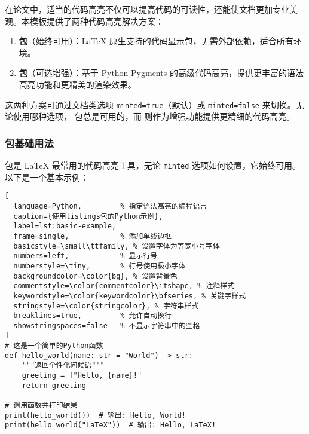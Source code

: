 在论文中，适当的代码高亮不仅可以提高代码的可读性，还能使文档更加专业美观。本模板提供了两种代码高亮解决方案：

\begin{enumerate}
  \item \textbf{ 包}（始终可用）：\LaTeX{} 原生支持的代码显示包，无需外部依赖，适合所有环境。
  \item \textbf{ 包}（可选增强）：基于 Python Pygments 的高级代码高亮，提供更丰富的语法高亮功能和更精美的渲染效果。
\end{enumerate}

这两种方案可通过文档类选项 \texttt{minted=true}（默认）或 \texttt{minted=false} 来切换。无论使用哪种选项， 包总是可用的，而  则作为增强功能提供更精细的代码高亮。


\subsubsection{ 包基础用法}

 包是 \LaTeX{} 最常用的代码高亮工具，无论 \texttt{minted} 选项如何设置，它始终可用。以下是一个基本示例：

\begin{lstlisting}[
  language=Python,         % 指定语法高亮的编程语言
  caption={使用listings包的Python示例},
  label=lst:basic-example,
  frame=single,            % 添加单线边框
  basicstyle=\small\ttfamily, % 设置字体为等宽小号字体
  numbers=left,            % 显示行号
  numberstyle=\tiny,       % 行号使用极小字体
  backgroundcolor=\color{bg}, % 设置背景色
  commentstyle=\color{commentcolor}\itshape, % 注释样式
  keywordstyle=\color{keywordcolor}\bfseries, % 关键字样式
  stringstyle=\color{stringcolor}, % 字符串样式
  breaklines=true,         % 允许自动换行
  showstringspaces=false   % 不显示字符串中的空格
]
# 这是一个简单的Python函数
def hello_world(name: str = "World") -> str:
    """返回个性化问候语"""
    greeting = f"Hello, {name}!"
    return greeting

# 调用函数并打印结果
print(hello_world())  # 输出: Hello, World!
print(hello_world("LaTeX"))  # 输出: Hello, LaTeX!
\end{lstlisting}

